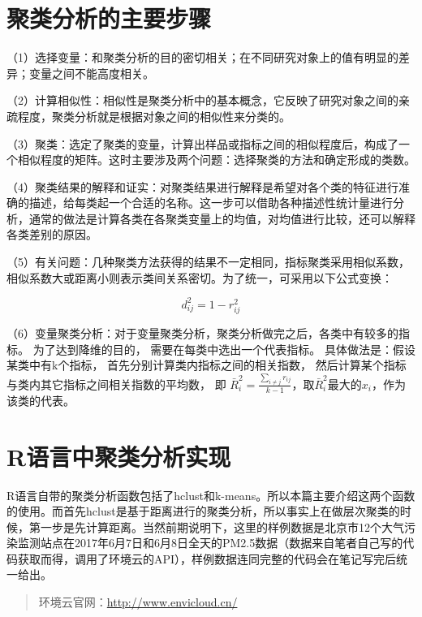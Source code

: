 \documentclass[]{ctexbook}
\begin{document}
\hypertarget{ux805aux7c7bux5206ux6790ux7684ux4e3bux8981ux6b65ux9aa4}{%
\section{聚类分析的主要步骤}\label{ux805aux7c7bux5206ux6790ux7684ux4e3bux8981ux6b65ux9aa4}}

（1）选择变量：和聚类分析的目的密切相关；在不同研究对象上的值有明显的差异；变量之间不能高度相关。

（2）计算相似性：相似性是聚类分析中的基本概念，它反映了研究对象之间的亲疏程度，聚类分析就是根据对象之间的相似性来分类的。

（3）聚类：选定了聚类的变量，计算出样品或指标之间的相似程度后，构成了一个相似程度的矩阵。这时主要涉及两个问题：选择聚类的方法和确定形成的类数。

（4）聚类结果的解释和证实：对聚类结果进行解释是希望对各个类的特征进行准确的描述，给每类起一个合适的名称。这一步可以借助各种描述性统计量进行分析，通常的做法是计算各类在各聚类变量上的均值，对均值进行比较，还可以解释各类差别的原因。

（5）有关问题：几种聚类方法获得的结果不一定相同，指标聚类采用相似系数，相似系数大或距离小则表示类间关系密切。为了统一，可采用以下公式变换：

\[d_{ij}^2=1-r_{ij}^2\]

（6）变量聚类分析：对于变量聚类分析，聚类分析做完之后，各类中有较多的指标。 为了达到降维的目的， 需要在每类中选出一个代表指标。 具体做法是：假设某类中有k个指标， 首先分别计算类内指标之间的相关指数， 然后计算某个指标与类内其它指标之间相关指数的平均数， 即
\(\bar R_i^2=\frac{\sum_{i\neq j}r_{ij}}{k-1}\)，取\(\bar R_i^2\)最大的\(x_i\)，作为该类的代表。

\hypertarget{rux8bedux8a00ux4e2dux805aux7c7bux5206ux6790ux5b9eux73b0}{%
\section{R语言中聚类分析实现}\label{rux8bedux8a00ux4e2dux805aux7c7bux5206ux6790ux5b9eux73b0}}

R语言自带的聚类分析函数包括了hclust和k-means。所以本篇主要介绍这两个函数的使用。而首先hclust是基于距离进行的聚类分析，所以事实上在做层次聚类的时候，第一步是先计算距离。当然前期说明下，这里的样例数据是北京市12个大气污染监测站点在2017年6月7日和6月8日全天的PM2.5数据（数据来自笔者自己写的代码获取而得，调用了环境云的API），样例数据连同完整的代码会在笔记写完后统一给出。

\begin{quote}
环境云官网：\url{http://www.envicloud.cn/}
\end{quote}
\end{document}
